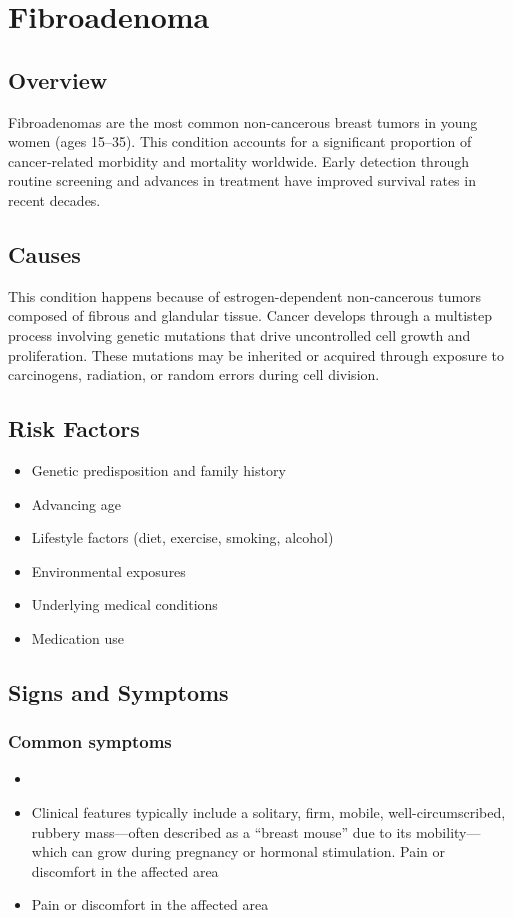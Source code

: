\chapter{Fibroadenoma}
\label{sec:Fibroadenoma}

\section{Overview}
Fibroadenomas are the most common non-cancerous breast tumors in young women (ages 15--35). This condition accounts for a significant proportion of cancer-related morbidity and mortality worldwide. Early detection through routine screening and advances in treatment have improved survival rates in recent decades.
\section{Causes}
This condition happens because of estrogen-dependent non-cancerous tumors composed of fibrous and glandular tissue. Cancer develops through a multistep process involving genetic mutations that drive uncontrolled cell growth and proliferation. These mutations may be inherited or acquired through exposure to carcinogens, radiation, or random errors during cell division.    
\section{Risk Factors}

\begin{itemize}[noitemsep]
  \item Genetic predisposition and family history
  \item Advancing age
  \item Lifestyle factors (diet, exercise, smoking, alcohol)
  \item Environmental exposures
  \item Underlying medical conditions
  \item Medication use
\end{itemize}
\section{Signs and Symptoms}

\subsection{Common symptoms}
\begin{itemize}[noitemsep]
  \item \item Clinical features typically include a solitary, firm, mobile, well-circumscribed, rubbery mass---often described as a ``breast mouse'' due to its mobility---which can grow during pregnancy or hormonal stimulation. Pain or discomfort in the affected area    \item Pain or discomfort in the affected area
  \end{itemize}

